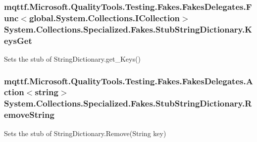 \hypertarget{class_system_1_1_collections_1_1_specialized_1_1_fakes_1_1_stub_string_dictionary_ad96337d41da989efa6dffa3f79ea802f}{
\subsubsection[{Keys\-Get}]{\setlength{\rightskip}{0pt plus 5cm}mqttf.\-Microsoft.\-Quality\-Tools.\-Testing.\-Fakes.\-Fakes\-Delegates.\-Func$<$global.\-System.\-Collections.\-I\-Collection$>$ System.\-Collections.\-Specialized.\-Fakes.\-Stub\-String\-Dictionary.\-Keys\-Get}}\label{class_system_1_1_collections_1_1_specialized_1_1_fakes_1_1_stub_string_dictionary_ad96337d41da989efa6dffa3f79ea802f}


Sets the stub of String\-Dictionary.\-get\-\_\-\-Keys()

\hypertarget{class_system_1_1_collections_1_1_specialized_1_1_fakes_1_1_stub_string_dictionary_a1dc91359fcfab3c4e8545f58f6fb92b3}{
\subsubsection[{Remove\-String}]{\setlength{\rightskip}{0pt plus 5cm}mqttf.\-Microsoft.\-Quality\-Tools.\-Testing.\-Fakes.\-Fakes\-Delegates.\-Action$<$string$>$ System.\-Collections.\-Specialized.\-Fakes.\-Stub\-String\-Dictionary.\-Remove\-String}}\label{class_system_1_1_collections_1_1_specialized_1_1_fakes_1_1_stub_string_dictionary_a1dc91359fcfab3c4e8545f58f6fb92b3}


Sets the stub of String\-Dictionary.\-Remove(\-String key)


